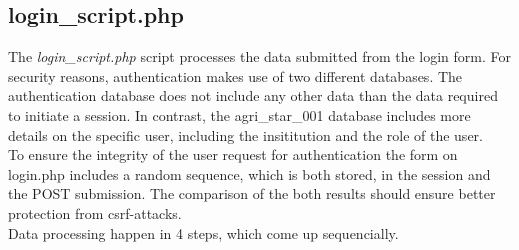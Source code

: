 \subsection{login\_script.php}\label{login_script}
The \emph{login\_script.php} script processes the data submitted from the login form. For security reasons, 
authentication makes use of two different databases. The authentication database does not include any other data than the data required to initiate a session. In contrast,
the agri\_star\_001 database includes more details on the specific user, including the insititution and the role of the user.\\
To ensure the integrity of the user request for authentication the form on login.php includes a random sequence, which is both stored, in the session and the POST submission. 
The comparison of the both results should ensure better protection from csrf-attacks.\\
Data processing happen in 4 steps, which come up sequencially.
